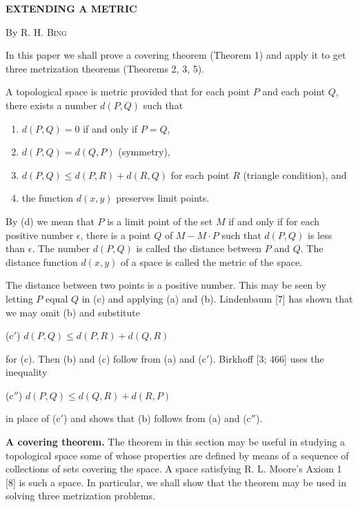 \documentclass[11pt,a4paper,leqno,twoside]{article}
\newcommand{\heading}[1]{\par\medskip\noindent\textbf{#1}\enspace}
\begin{document}
\setcounter{page}{511}\thispagestyle{plain}
\begin{center}\textbf{EXTENDING A METRIC}\par\medskip By \textsc{R. H. Bing}\end{center}
In this paper we shall prove a covering theorem (Theorem 1) and apply it to get three metrization theorems (Theorems 2, 3, 5).

A topological space is metric provided that for each point $P$ and each point $Q$, there exists a number $d(P,Q)$ such that
\begin{enumerate}[label=(\alph*),nosep,leftmargin=2.5em]
\item $d(P,Q)=0$ if and only if $P=Q$,
\item $d(P,Q)=d(Q,P)$ (symmetry),
\item $d(P,Q)\leq d(P,R)+d(R,Q)$ for each point $R$ (triangle condition), and
\item the function $d(x,y)$ preserves limit points.
\end{enumerate}
By (d) we mean that $P$ is a limit point of the set $M$ if and only if for each positive number $\epsilon$, there is a point $Q$ of $M-M\cdot P$ such that $d(P,Q)$ is less than $\epsilon$. The number $d(P,Q)$ is called the distance between $P$ and $Q$. The distance function $d(x,y)$ of a space is called the metric of the space.

The distance between two points is a positive number. This may be seen by letting $P$ equal $Q$ in (c) and applying (a) and (b). Lindenbaum [7] has shown that we may omit (b) and substitute
\par\noindent\hspace*{1.5em}(c$'$) $d(P,Q)\leq d(P,R)+d(Q,R)$
\par\noindent for (c). Then (b) and (c) follow from (a) and (c$'$). Birkhoff [3; 466] uses the inequality
\par\noindent\hspace*{1.5em}(c$''$) $d(P,Q)\leq d(Q,R)+d(R,P)$
\par\noindent in place of (c$'$) and shows that (b) follows from (a) and (c$''$).

\heading{A covering theorem.} The theorem in this section may be useful in studying a topological space some of whose properties are defined by means of a sequence of collections of sets covering the space. A space satisfying R. L. Moore's Axiom 1 [8] is such a space. In particular, we shall show that the theorem may be used in solving three metrization problems.
\end{document}
